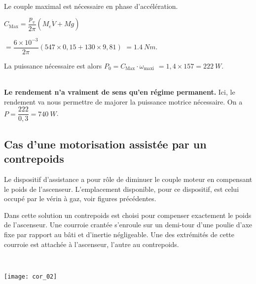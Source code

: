 \ifprof
\begin{corrige}~\\
Le couple maximal est nécessaire en phase d’accélération.

$C_{\text{Max}} = \dfrac{p_v}{2\pi}\left(M_e \dot{V} +Mg\right) $ 

$=\dfrac{6\times 10^{-3}}{2\pi}\left(547 \times 0,15 +130 \times 9,81\right)$ $=\SI{1,4}{Nm}$.

La puissance nécessaire est alors $P_0 = C_{\text{Max}}  \cdot \omega_{\text{maxi}}$ $=1,4\times 157 =\SI{222}{W}$.
\end{corrige}
\else
\fi


\ifprof
\begin{corrige}~\\
\textbf{Le rendement n'a vraiment de sens qu'en régime permanent.}
Ici, le rendement va nous permettre de majorer la puissance motrice nécessaire.
On a $P=\dfrac{222}{0,3}= \SI{740}{W}$.
\end{corrige}
\else
\fi



\subsection*{Cas d’une motorisation assistée par un contrepoids}

\ifprof
\else
Le dispositif d’assistance a pour rôle de diminuer le couple moteur en compensant le poids de l’ascenseur. L’emplacement disponible, pour ce dispositif, est celui occupé par le vérin à gaz, voir figures précédentes.

Dans cette solution un contrepoids est choisi pour compenser exactement
le poids de l’ascenseur. Une courroie crantée s’enroule sur un demi-tour d’une
poulie d’axe fixe par rapport au bâti et d'inertie négligeable. Une des extrémités de cette courroie est
attachée à l’ascenseur, l’autre au contrepoids.
\fi

\ifprof
\begin{corrige}~\\
\begin{center}
\texttt{[image: cor\_02]}
\end{center}

\end{corrige}
\else
\fi

